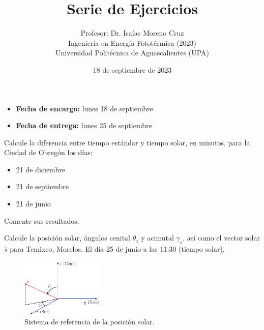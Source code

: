 \documentclass[spanish, letterpaper,12]{article}
\newenvironment{problem}[2][Problema]{\begin{trivlist}
\item[\hskip \labelsep {\bfseries #1}\hskip \labelsep {\bfseries #2.}]}{\end{trivlist}}
\begin{document}
 
\title{Serie de Ejercicios}
\author{Profesor: Dr. Isaías Moreno Cruz\\
  Ingeniería en Energía Fototérmica (2023)\\
Universidad Politécnica de Aguascalientes (UPA)}
\date{18 de septiembre de 2023}

\maketitle

\begin{itemize}[leftmargin=*, noitemsep]
\item \textbf{Fecha de encargo:} lunes 18 de septiembre
\item \textbf{Fecha de entrega:} lunes 25 de septiembre
\end{itemize}
\thispagestyle{fancy}
\begin{problem}{1}
  Calcule la diferencia entre tiempo estándar y tiempo solar, en minutos, para la Ciudad de Obregón los días:
  \begin{itemize}[noitemsep]
    \item 21 de diciembre
    \item 21 de septiembre
    \item 21 de junio
  \end{itemize}

  Comente sus resultados.
\end{problem}

\begin{problem}{2}
  Calcule la posición solar, ángulos cenital $\theta_z$ y acimutal $\gamma_s$, así como el vector solar $\hat s$ para Temixco, Morelos. El día 25 de junio  a las 11:30 (tiempo solar).

\begin{figure}[ht]
  \centering
  \includegraphics[width=0.35\textwidth]{vectorSolar}
  \caption{\label{fig:vectorSolar} Sistema de referencia de la posición solar.}
\end{figure}

\end{problem}
\end{document}
